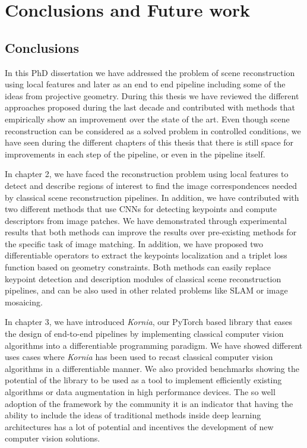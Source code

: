 \chapter{Conclusions and Future work}
\label{chap:end}

\section{Conclusions}

In this PhD dissertation we have addressed the problem of scene reconstruction using local features and later as an end to end pipeline including some of the ideas from projective geometry. During this thesis we have reviewed the different approaches proposed during the last decade and contributed with methods that empirically show an improvement over the state of the art. Even though scene reconstruction can be considered as a solved problem in controlled conditions, we have seen during the different chapters of this thesis that there is still space for improvements in each step of the pipeline, or even in the pipeline itself.

In chapter 2, we have faced the reconstruction problem using local features to detect and describe regions of interest to find the image correspondences needed by classical scene reconstruction pipelines. In addition, we have contributed with two different methods that use CNNs for detecting keypoints and compute descriptors from image patches. We have demonstrated through experimental results that both methods can improve the results over pre-existing methods for the specific task of image matching. In addition, we have proposed two differentiable operators to extract the keypoints localization and a triplet loss function based on geometry constraints. Both methods can easily replace keypoint detection and description modules of classical scene reconstruction pipelines, and can be also used in other related problems like SLAM or image mosaicing.

In chapter 3, we have introduced \textit{Kornia}, our PyTorch based library that eases the design of end-to-end pipelines by implementing classical computer vision algorithms into a differentiable programming paradigm. We have showed different uses cases where \textit{Kornia} has been used to recast classical computer vision algorithms in a differentiable manner. We also provided benchmarks showing the potential of the library to be used as a tool to implement efficiently existing algorithms or data augmentation in high performance devices. The so well adoption of the framework by the community it is an indicator that having the ability to include the ideas of traditional methods inside deep learning architectures has a lot of potential and incentives the development of new computer vision solutions.

